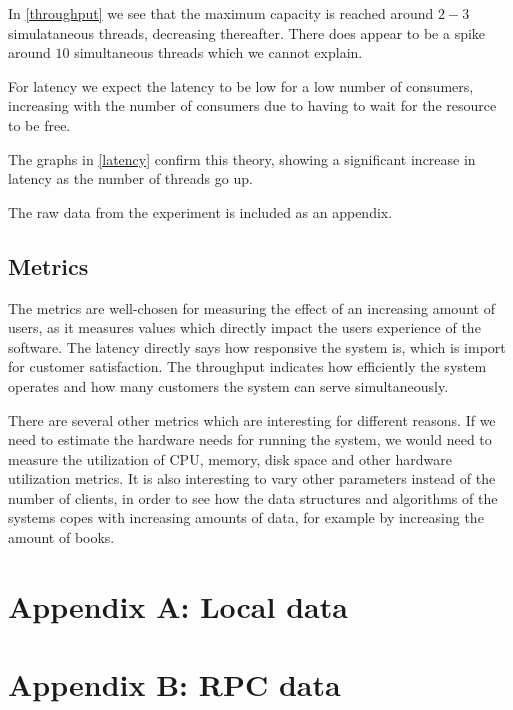 \documentclass[11pt,a4paper]{article}
\begin{document}
In \autoref{throughput} we see that the maximum capacity is reached around
$2-3$ simulataneous threads, decreasing thereafter. There does appear to be a
spike around $10$ simultaneous threads which we cannot explain.

For latency we expect the latency to be low for a low number of
consumers, increasing with the number of consumers due to having to wait for
the resource to be free.

The graphs in \autoref{latency} confirm this theory, showing a significant
increase in latency as the number of threads go up.

The raw data from the experiment is included as an appendix.

\subsection{Metrics}
The metrics are well-chosen for measuring the effect of an increasing amount
of users, as it measures values which directly impact the users experience of
the software. The latency directly says how responsive the system is, which is
import for customer satisfaction. The throughput indicates how efficiently the
system operates and how many customers the system can serve simultaneously.

There are several other metrics which are interesting for different reasons.
If we need to estimate the hardware needs for running the system, we would
need to measure the utilization of CPU, memory, disk space and other hardware
utilization metrics. It is also interesting to vary other parameters instead of
the number of clients, in order to see how the data structures and algorithms
of the systems copes with increasing amounts of data, for example by increasing
the amount of books.


\appendix
\section*{Appendix A: Local data}
\label{a}

\section*{Appendix B: RPC data}
\label{b}

\newpage
\end{document}
